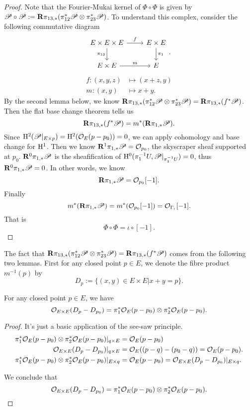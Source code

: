 \documentclass[../main.tex]{subfiles}
\begin{document}
\begin{proof}Note that the Fourier-Mukai kernel of $\Phi\circ \Phi$ is given by $\mathscr{P}\circ \mathscr{P}:=\mathbf{R} \pi_{13, *}(\pi_{12}^{*}\mathscr{P}\otimes \pi_{23}^{*}\mathscr{P})$. To understand this complex, consider the following commutative diagram
$$\begin{tikzcd}
E\times E\times E\arrow{r}{f}\arrow[swap]{d}{\pi_{13}} & E\times E\arrow{d}{\pi_{1}}\\
E\times E \arrow{r}{m} & E
\end{tikzcd}.$$
\begin{align*}f:(x,y,z)&\mapsto (x+z,y)\\
m:(x,y)&\mapsto x+y.\end{align*}
By the second lemma below, we know $\mathbf{R} \pi_{13, *}(\pi_{12}^{*}\mathscr{P}\otimes \pi_{23}^{*}\mathscr{P})=\mathbf{R} \pi_{13, *}(f^{*}\mathscr{P})$. Then the flat base change theorem tells us 
$$\mathbf{R} \pi_{13, *}(f^{*}\mathscr{P})=m^{*}(\mathbf{R}\pi_{1, *}\mathscr{P}).$$
Since $\mathrm{H}^{2}(\mathscr{P}|_{E\times p})=\mathrm{H}^{2}(\mathcal{O}_{E}(p-p_{0}))=0$, we can apply cohomology and base change for $\mathrm{H}^{1}$. Then we know $\mathbf{R}^{1}\pi_{1, *}\mathscr{P}=\mathcal{O}_{p_{0}}$, the skyscraper sheaf supported at $p_{0}$. $\mathbf{R}^{0}\pi_{1, *}\mathscr{P}$ is the sheafification of $\mathrm{H}^{0}(\pi_{1}^{-1}U, \mathscr{P}|_{\pi_{1}^{-1}U})=0$, thus $\mathbf{R}^{0}\pi_{1, *}\mathscr{P}=0$. In other words, we know 
$$\mathbf{R}\pi_{1, *}\mathscr{P}=\mathcal{O}_{p_{0}}[-1].$$
Finally $$m^{*}(\mathbf{R}\pi_{1, *}\mathscr{P})=m^{*}(\mathcal{O}_{p_{0}}[-1])=\mathcal{O}_{\Gamma_{\iota}}[-1].$$ 
That is 
$$\Phi\circ \Phi=\iota\circ[-1].$$
\end{proof}
The fact that $\mathbf{R} \pi_{13, *}(\pi_{12}^{*}\mathscr{P}\otimes \pi_{23}^{*}\mathscr{P})=\mathbf{R} \pi_{13, *}(f^{*}\mathscr{P})$ comes from the following two lemmas. First for any closed point $p\in E$, we denote the fibre product  $m^{-1}(p)$ by 
$$D_{p}:=\{(x, y)\in E\times E|x+y=p\}.$$
\begin{lemma}
For any closed point $p\in E$, we have 
$$\mathcal{O}_{E\times E}(D_{p}-D_{p_{0}})=\pi_{1}^{*}\mathcal{O}_{E}(p-p_{0})\otimes \pi_{2}^{*}\mathcal{O}_{E}(p-p_{0}).$$
\end{lemma}
\begin{proof}It's just a basic application of the see-saw principle. 
\begin{align*}
\pi_{1}^{*}\mathcal{O}_{E}(p-p_{0})\otimes \pi_{2}^{*}\mathcal{O}_{E}(p-p_{0})|_{q\times E}&=\mathcal{O}_{E}(p-p_{0})\\
\mathcal{O}_{E\times E}(D_{p}-D_{p_{0}})|_{q\times E}&=\mathcal{O}_{E}((p-q)-(p_{0}-q))=\mathcal{O}_{E}(p-p_{0}).\\
\pi_{1}^{*}\mathcal{O}_{E}(p-p_{0})\otimes \pi_{2}^{*}\mathcal{O}_{E}(p-p_{0})|_{E\times q}&=\mathcal{O}_{E}(p-p_{0})=\mathcal{O}_{E\times E}(D_{p}-D_{p_{0}})|_{E\times q}.
\end{align*}


We conclude that 
$$\mathcal{O}_{E\times E}(D_{p}-D_{p_{0}})=\pi_{1}^{*}\mathcal{O}_{E}(p-p_{0})\otimes \pi_{2}^{*}\mathcal{O}_{E}(p-p_{0}).$$
\end{proof}
\end{document}
